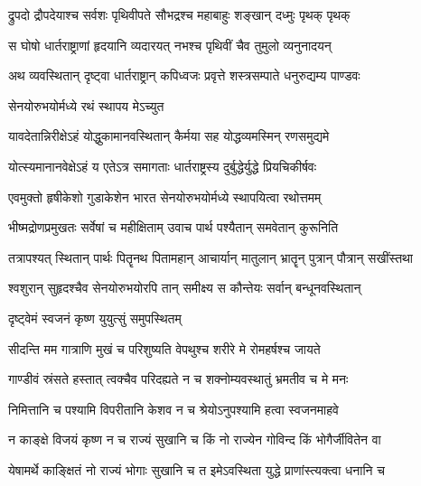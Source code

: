 \twolineshloka
{द्रुपदो द्रौपदेयाश्च सर्वशः पृथिवीपते}
{सौभद्रश्च महाबाहुः शङ्खान् दध्मुः पृथक् पृथक्}%

\twolineshloka
{स घोषो धार्तराष्ट्राणां हृदयानि व्यदारयत्}
{नभश्च पृथिवीं चैव तुमुलो व्यनुनादयन्}%

\twolineshloka
{अथ व्यवस्थितान् दृष्ट्वा धार्तराष्ट्रान् कपिध्वजः}
{प्रवृत्ते शस्त्रसम्पाते धनुरुद्यम्य पाण्डवः}%


\onelineshloka
{सेनयोरुभयोर्मध्ये रथं स्थापय मेऽच्युत}%

\twolineshloka
{यावदेतान्निरीक्षेऽहं योद्धुकामानवस्थितान्}
{कैर्मया सह योद्धव्यमस्मिन् रणसमुद्यमे}%

\twolineshloka
{योत्स्यमानानवेक्षेऽहं य एतेऽत्र समागताः}
{धार्तराष्ट्रस्य दुर्बुद्धेर्युद्धे प्रियचिकीर्षवः}%

\twolineshloka
{एवमुक्तो हृषीकेशो गुडाकेशेन भारत}
{सेनयोरुभयोर्मध्ये स्थापयित्वा रथोत्तमम्}%

\twolineshloka
{भीष्मद्रोणप्रमुखतः सर्वेषां च महीक्षिताम्}
{उवाच पार्थ पश्यैतान् समवेतान् कुरूनिति}%

\twolineshloka
{तत्रापश्यत् स्थितान् पार्थः पितॄनथ पितामहान्}
{आचार्यान् मातुलान् भ्रातॄन् पुत्रान् पौत्रान् सखींस्तथा}%

\twolineshloka
{श्वशुरान् सुहृदश्चैव सेनयोरुभयोरपि}
{तान् समीक्ष्य स कौन्तेयः सर्वान् बन्धूनवस्थितान्}%


\onelineshloka
{दृष्ट्वेमं स्वजनं कृष्ण युयुत्सुं समुपस्थितम्}%

\twolineshloka
{सीदन्ति मम गात्राणि मुखं च परिशुष्यति}
{वेपथुश्च शरीरे मे रोमहर्षश्च जायते}%

\twolineshloka
{गाण्डीवं स्रंसते हस्तात् त्वक्चैव परिदह्यते}
{न च शक्नोम्यवस्थातुं भ्रमतीव च मे मनः}%

\twolineshloka
{निमित्तानि च पश्यामि विपरीतानि केशव}
{न च श्रेयोऽनुपश्यामि हत्वा स्वजनमाहवे}%

\twolineshloka
{न काङ्क्षे विजयं कृष्ण न च राज्यं सुखानि च}
{किं नो राज्येन गोविन्द किं भोगैर्जीवितेन वा}%

\twolineshloka
{येषामर्थे काङ्क्षितं नो राज्यं भोगाः सुखानि च}
{त इमेऽवस्थिता युद्धे प्राणांस्त्यक्त्वा धनानि च}%

